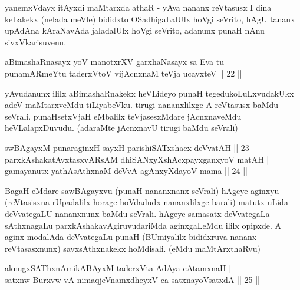 \begin{artha}
yanemxVdayx itAyxdi maMtarxda athaR - yAva nananx reVtasusx I dina 
keLakekx (nelada meVle) bididxto OSadhigaLalUlx hoVgi seVrito, hAgU 
tananx upAdAna kAraNavAda jaladalUlx hoVgi seVrito, adanunx punaH nAnu 
sivxVkarisuvenu.
\end{artha}

\begin{shl}
aBimashaRnasayx yoV manotxrXV garxhaNasayx sa Eva tu | \\
punamARmeYtu taderxVtoV vijAcnxnaM teVja ucayxteV \hfill|| 22 || 
\end{shl}

\begin{artha}
yAvudanunx ililx aBimashaRnakekx heVLideyo punaH tegedukoLuLxvudakUkx 
adeV maMtarxveMdu tiLiyabeVku. tirugi nananxlilxge A reVtasusx baMdu 
seVrali. punaHsetxVjaH eMbalilx teVjasesxMdare jAcnxnaveMdu 
heVLalapxDuvudu. (adaraMte jAcnxnavU tirugi baMdu seVrali)
\end{artha}


\begin{shl}
swBAgayxM punaraginxH sayxH parishiSATxshacx deVvatAH \hfill|| 23 | \\
parxkAshakatAvxtasxvARsAM dhiSANxyXshAcxpayxganxyoV matAH | \\
gamayanutx yathAsAthxnaM deVvA agAnxyXdayoV mama \hfill|| 24 || 
\end{shl}

\begin{artha}
BagaH eMdare sawBAgayxvu (punaH nananxnanx seVrali) hAgeye aginxyu 
(reVtasisxna rUpadalilx horage hoVdadudx nananxlilxge barali) matutx 
uLida deVvategaLU nananxnunx baMdu seVrali. hAgeye samasatx 
deVvategaLa sAthxnagaLu parxkAshakavAgiruvudariMda aginxgaLeMdu ililx 
opipxde. A aginx modalAda deVvategaLu punaH (BUmiyalilx bididxruva 
nananx reVtasasxnunx) savxsAthxnakekx hoMdisali. (eMdu maMtArxthaRvu)
\end{artha}


\begin{shl}
aknugxSAThxnAmikABAyxM taderxVta AdAya cA\s \s tamxnaH | \\
satxnw Burxvw vA nimaqjeVnamxdheyxV ca satxnayoVsatxdA \hfill|| 25 || 
\end{shl}

